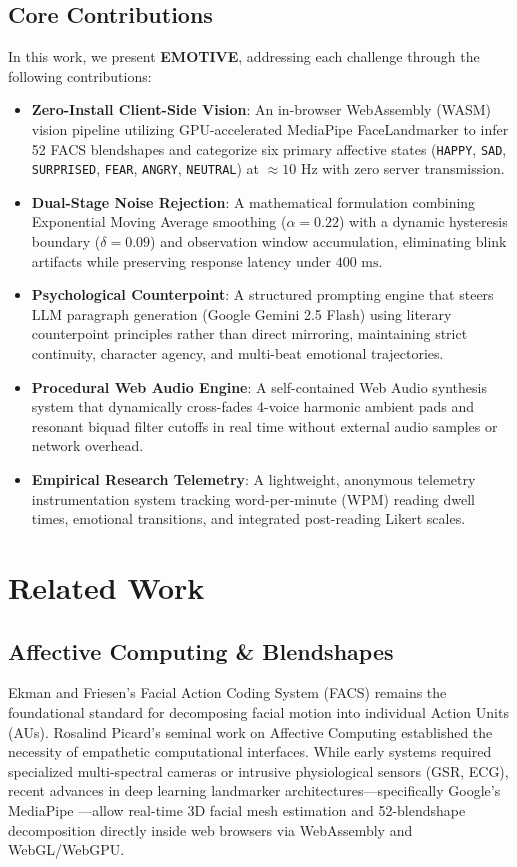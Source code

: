 \documentclass[sigconf,nonacm]{acmart}
\begin{document}
\subsection{Core Contributions}

In this work, we present \textbf{EMOTIVE}, addressing each challenge through the following contributions:
\begin{itemize}
    \item \textbf{Zero-Install Client-Side Vision}: An in-browser WebAssembly (WASM) vision pipeline utilizing GPU-accelerated MediaPipe FaceLandmarker to infer 52 FACS blendshapes and categorize six primary affective states (\texttt{HAPPY}, \texttt{SAD}, \texttt{SURPRISED}, \texttt{FEAR}, \texttt{ANGRY}, \texttt{NEUTRAL}) at $\approx 10\text{ Hz}$ with zero server transmission.
    \item \textbf{Dual-Stage Noise Rejection}: A mathematical formulation combining Exponential Moving Average smoothing ($\alpha = 0.22$) with a dynamic hysteresis boundary ($\delta = 0.09$) and observation window accumulation, eliminating blink artifacts while preserving response latency under $400\text{ ms}$.
    \item \textbf{Psychological Counterpoint}: A structured prompting engine that steers LLM paragraph generation (Google Gemini 2.5 Flash) using literary counterpoint principles rather than direct mirroring, maintaining strict continuity, character agency, and multi-beat emotional trajectories.
    \item \textbf{Procedural Web Audio Engine}: A self-contained Web Audio synthesis system that dynamically cross-fades 4-voice harmonic ambient pads and resonant biquad filter cutoffs in real time without external audio samples or network overhead.
    \item \textbf{Empirical Research Telemetry}: A lightweight, anonymous telemetry instrumentation system tracking word-per-minute (WPM) reading dwell times, emotional transitions, and integrated post-reading Likert scales.
\end{itemize}

\section{Related Work}

\subsection{Affective Computing \& Blendshapes}
Ekman and Friesen's Facial Action Coding System (FACS) \cite{ekman1978facial} remains the foundational standard for decomposing facial motion into individual Action Units (AUs). Rosalind Picard's seminal work on Affective Computing \cite{picard2000affective} established the necessity of empathetic computational interfaces. While early systems required specialized multi-spectral cameras or intrusive physiological sensors (GSR, ECG), recent advances in deep learning landmarker architectures---specifically Google's MediaPipe \cite{lugaresi2019mediapipe}---allow real-time 3D facial mesh estimation and 52-blendshape decomposition directly inside web browsers via WebAssembly and WebGL/WebGPU.
\end{document}
